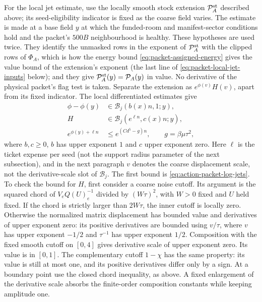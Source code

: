 For the local jet estimate, use the locally smooth stock extension
$\mathcal P_A^{\rm st}$ described above; its seed-eligibility indicator
is fixed as the coarse field varies. The estimate is made at a base
field $y$ at which the funded-room and manifest-sector conditions hold
and the packet's $500B$ neighbourhood is healthy. These hypotheses are
used twice. They identify the unmasked rows in the exponent of
$\mathcal P_A^{\rm st}$ with the clipped rows of $\Phi_A$, which is
how the energy bound \eqref{eq:packet-assigned-energy} gives the value
bound of the extension's exponent (the last line of
\eqref{eq:packet-local-jet-inputs} below); and they give
$\mathcal P_A^{\rm st}(y)=\mathcal P_A(y)$ in value. No derivative of
the physical packet's flag test is taken. Separate the extension as
$e^{\phi(v)}H(v)$, apart from its fixed indicator. The local differentiated estimates give
\begin{equation}\label{eq:packet-local-jet-inputs}
 \begin{split}
 \phi-\phi(y)&\in\mathcal B_j(b(x)n,1;y),\\
 H&\in\mathcal B_j(e^{\ell n},c(x)n;y),\\
 e^{\phi(y)+\ell n}&\le e^{(C d^5-g)n},
       \qquad g=\beta\mu\tau^2,
 \end{split}
\end{equation}
where $b,c\ge0$, $b$ has upper exponent $1$ and $c$ upper exponent
zero. Here $\ell$ is the ticket expense per seed (not the
support radius parameter of the next subsection), and in the next
paragraph $v$ denotes the coarse displacement scale, not the
derivative-scale slot of $\mathcal B_j$. The first bound is
\eqref{eq:action-packet-log-jets}. To check the bound for $H$, first
consider a coarse noise cutoff. Its argument is the squared chord
of $V_e Q(U)_e^{-1}$ divided by $(W\tau)^2$, with $W>0$ fixed
and $U$ held fixed. If the chord is strictly larger than $2W\tau$,
the inner cutoff is locally zero. Otherwise the normalized matrix
displacement has bounded value and derivatives of upper exponent
zero: its positive derivatives are bounded using $v/\tau$, where
$v$ has upper exponent $-1/2$ and $\tau^{-1}$ has upper exponent
$1/2$. Composition with the fixed smooth cutoff on $[0,4]$ gives
derivative scale of upper exponent zero. Its value is in $[0,1]$.
The complementary cutoff $1-\chi$ has the same property: its value
is still at most one, and its positive derivatives differ only by
a sign. At a boundary point use the closed chord inequality, as
above. A fixed enlargement of the derivative scale absorbs the
finite-order composition constants while keeping amplitude one.

